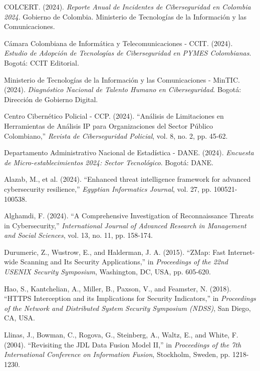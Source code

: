 \begin{thebibliography}{50}

COLCERT. (2024). \textit{Reporte Anual de Incidentes de Ciberseguridad en Colombia 2024}. Gobierno de Colombia. Ministerio de Tecnologías de la Información y las Comunicaciones.

Cámara Colombiana de Informática y Telecomunicaciones - CCIT. (2024). \textit{Estudio de Adopción de Tecnologías de Ciberseguridad en PYMES Colombianas}. Bogotá: CCIT Editorial.

Ministerio de Tecnologías de la Información y las Comunicaciones - MinTIC. (2024). \textit{Diagnóstico Nacional de Talento Humano en Ciberseguridad}. Bogotá: Dirección de Gobierno Digital.

Centro Cibernético Policial - CCP. (2024). ``Análisis de Limitaciones en Herramientas de Análisis IP para Organizaciones del Sector Público Colombiano,'' \textit{Revista de Ciberseguridad Policial}, vol. 8, no. 2, pp. 45-62.

Departamento Administrativo Nacional de Estadística - DANE. (2024). \textit{Encuesta de Micro-establecimientos 2024: Sector Tecnológico}. Bogotá: DANE.

Alazab, M., et al. (2024). ``Enhanced threat intelligence framework for advanced cybersecurity resilience,'' \textit{Egyptian Informatics Journal}, vol. 27, pp. 100521-100538.

Alghamdi, F. (2024). ``A Comprehensive Investigation of Reconnaissance Threats in Cybersecurity,'' \textit{International Journal of Advanced Research in Management and Social Sciences}, vol. 13, no. 11, pp. 158-174.

Durumeric, Z., Wustrow, E., and Halderman, J. A. (2015). ``ZMap: Fast Internet-wide Scanning and Its Security Applications,'' in \textit{Proceedings of the 22nd USENIX Security Symposium}, Washington, DC, USA, pp. 605-620.

Hao, S., Kantchelian, A., Miller, B., Paxson, V., and Feamster, N. (2018). ``HTTPS Interception and its Implications for Security Indicators,'' in \textit{Proceedings of the Network and Distributed System Security Symposium (NDSS)}, San Diego, CA, USA.

Llinas, J., Bowman, C., Rogova, G., Steinberg, A., Waltz, E., and White, F. (2004). ``Revisiting the JDL Data Fusion Model II,'' in \textit{Proceedings of the 7th International Conference on Information Fusion}, Stockholm, Sweden, pp. 1218-1230.


\end{thebibliography}
